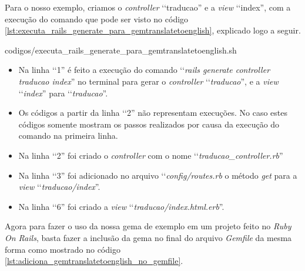 Para o nosso exemplo, criamos o \emph{controller} ‘‘traducao'' e a \emph{view} ‘‘index'', com a execução do
comando que pode ser visto no código \ref{lst:executa_rails_generate_para_gemtranslatetoenglish},
explicado logo a seguir.


{codigos/executa_rails_generate_para_gemtranslatetoenglish.sh}

\begin{itemize}

 \item Na linha ‘‘1'' é feito a execução do comando ‘‘\emph{rails generate controller traducao index}'' no
 terminal para gerar o \emph{controller} ‘‘\emph{traducao}'', e a \emph{view} ‘‘\emph{index}'' para
 ‘‘\emph{traducao}''.

 \item Os códigos a partir da linha ‘‘2'' não representam execuções. No caso estes códigos somente
 mostram os passos realizados por causa da execução do comando na primeira linha.

 \item Na linha ‘‘2'' foi criado o \emph{controller} com o nome ‘‘\emph{traducao\_controller.rb}''

 \item Na linha ‘‘3'' foi adicionado no arquivo ‘‘\emph{config/routes.rb} o método \emph{get} para a
 \emph{view} ‘‘\emph{traducao/index}''.

 \item Na linha ‘‘6'' foi criado a \emph{view} ‘‘\emph{traducao/index.html.erb}''.

\end{itemize}


Agora para fazer o uso da nossa gema de exemplo em um projeto feito no \emph{Ruby On Rails}, basta fazer a
inclusão da gema no final do arquivo \emph{Gemfile} da mesma forma como mostrado no código
\ref{lst:adiciona_gemtranslatetoenglish_no_gemfile}.

